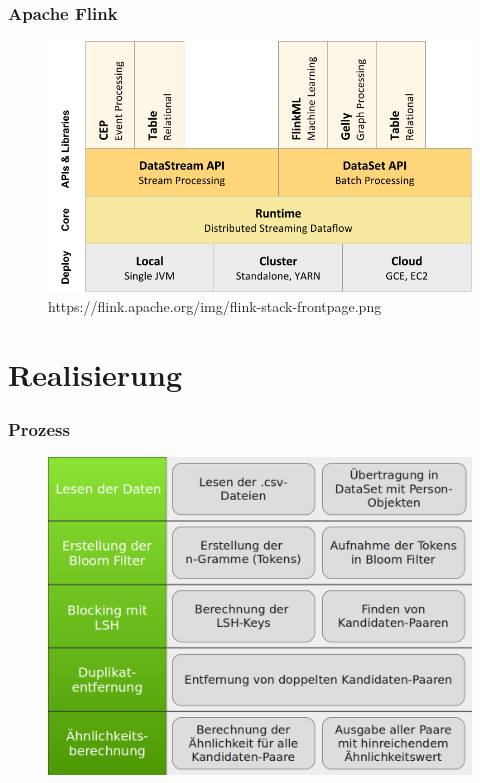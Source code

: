 \documentclass{beamer}
\begin{document}
    \begin{frame}
    		\frametitle{Apache Flink}
            \begin{figure}[H]
                \includegraphics[width=\textwidth]{graphics/flink_stack.png}
                \caption{https://flink.apache.org/img/flink-stack-frontpage.png}
            \end{figure}
    \end{frame}
    
    \section[Section]{Realisierung}
    
    \begin{frame}
    		\frametitle{Prozess}
    		\begin{figure}[H]
    			\includegraphics[width=\textwidth]{graphics/process.png}
    		\end{figure}
    \end{frame}
    
\end{document}

